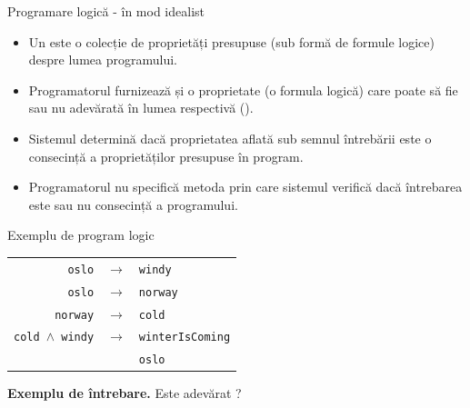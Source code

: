 \documentclass[xcolor=pdftex,romanian,colorlinks]{beamer}
\begin{document}
\begin{frame}{Programare logică - în mod idealist}
\begin{itemize}
	\item Un  este o colecție de proprietăți presupuse (sub formă de formule logice) despre lumea programului.
	\medskip
	\item Programatorul furnizează și o proprietate (o formula logică) care poate să fie sau nu adevărată în lumea respectivă ().
	\medskip
	\item Sistemul determină dacă proprietatea aflată sub semnul întrebării este o consecință a proprietăților presupuse în program.
	\medskip
		\item Programatorul nu specifică metoda prin care sistemul verifică dacă întrebarea este sau nu consecință a programului.
\end{itemize}
\end{frame}

\begin{frame}{Exemplu de program logic}
\begin{center}
\begin{tabular}{rcl}
\texttt{oslo} & $\to$ & \texttt{windy} \\[.5em]
\texttt{oslo} & $\to$ & \texttt{norway} \\[.5em]
\texttt{norway} & $\to$ & \texttt{cold} \\[.5em]
\texttt{cold $\wedge$ windy} & $\to$ & \texttt{winterIsComing} \\[.5em]
& & \texttt{oslo}\\
\end{tabular}
\end{center}
\bigskip 

\textbf{\color{True} Exemplu de întrebare.}
Este adevărat ?
\end{frame}

\end{document}
